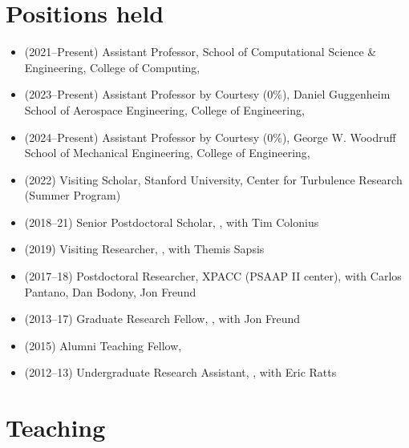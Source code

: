 \section{Positions held}

\begin{itemize}
    \item (2021--Present) Assistant Professor, School of Computational Science \& Engineering, College of Computing, \GIT
    \item (2023--Present) Assistant Professor by Courtesy (0\%), Daniel Guggenheim School of Aerospace Engineering, College of Engineering, \GIT
    \item (2024--Present) Assistant Professor by Courtesy (0\%), George W. Woodruff School of Mechanical Engineering, College of Engineering, \GIT
    \item (2022) Visiting Scholar, Stanford University, Center for Turbulence Research (Summer Program)
    \item (2018--21) Senior Postdoctoral Scholar, \CIT, with Tim Colonius
    \item (2019) Visiting Researcher, \MIT, with Themis Sapsis
    \item (2017--18) Postdoctoral Researcher, XPACC (PSAAP II center), with Carlos Pantano, Dan Bodony, Jon Freund
    \item (2013--17) Graduate Research Fellow, \UIUC, with Jon Freund
    \item (2015) Alumni Teaching Fellow, \UIUC
    \item (2012--13) Undergraduate Research Assistant, \UMD, with Eric Ratts
\end{itemize}

\section{Teaching}

\subsection{\GIT}

